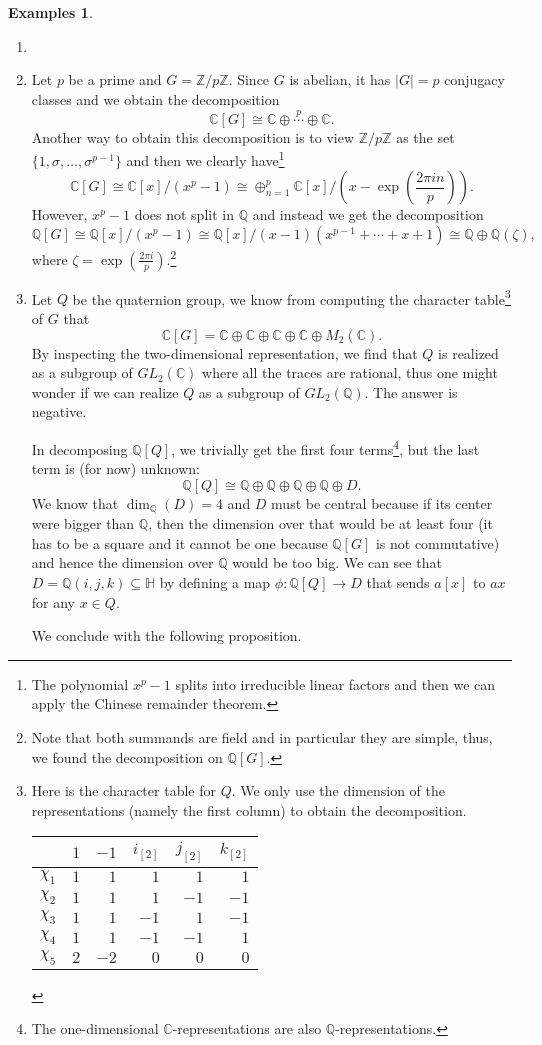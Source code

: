 \documentclass{tufte-handout} %
\theoremstyle{definition}
\newtheorem{exmps}[thm]{Examples}
\theoremstyle{remark}
\newcommand{\bra}[1]{\left(#1\right)}
\newcommand{\Z}{\mathbb{Z}}
\renewcommand{\C}{\mathbb{C}}
\newcommand{\Q}{\mathbb{Q}}
\newcommand{\bH}{\mathbb{H}}
\begin{document}
\begin{exmps}
	\begin{enumerate}
		\item[]
		\item Let $p$ be a prime and $G = \Z/p\Z$. Since $G$ is abelian, it has $|G| = p$ conjugacy classes and we obtain the decomposition	\[\C[G] \cong \C \oplus \stackrel{p}{\cdots} \oplus \C.\]
		Another way to obtain this decomposition is to view $\Z/p\Z$ as the set $\{1, \sigma, \dots, \sigma^{p-1}\}$ and then we clearly have\footnote{The polynomial $x^p-1$ splits into irreducible linear factors and then we can apply the Chinese remainder theorem.}
		\[\C[G] \cong \C[x]/(x^p-1) \cong \oplus_{n=1}^{p} \C[x]/\bra{x-\exp\bra{\frac{2\pi i n}{p}}}.\]
		However, $x^p-1$ does not split in $\Q$ and instead we get the decomposition
		\[\Q[G] \cong \Q[x]/(x^p-1) \cong \Q[x]/(x-1)(x^{p-1}+ \cdots + x + 1) \cong \Q \oplus \Q(\zeta),\] where $\zeta = \exp\bra{\frac{2\pi i}{p}}$.\footnote{Note that both summands are field and in particular they are simple, thus, we found the decomposition on $\Q[G]$.}
		\item Let $Q$ be the quaternion group, we know from computing the character table\footnote{Here is the character table for $Q$. We only use the dimension of the representations (namely the first column) to obtain the decomposition.
				\begin{tabular}{lrrrrr}
					& $1$ & $-1$ & $i_{[2]}$ & $j_{[2]}$ & $k_{[2]}$\\ \hline
					$\chi_1$ & $1$& $1$& $1$& $1$&$1$\\
					$\chi_2$ & $1$& $1$& $1$& $-1$&$-1$\\
					$\chi_3$ & $1$& $1$& $-1$& $1$&$-1$\\
					$\chi_4$ & $1$& $1$& $-1$& $-1$&$1$\\
					$\chi_5$ & $2$& $-2$& $0$& $0$&$0$\\ \hline
				\end{tabular}} of $G$ that \[\C[G] = \C \oplus \C \oplus \C \oplus \C \oplus M_2(\C).\]
		By inspecting the two-dimensional representation, we find that $Q$ is realized as a subgroup of $GL_2(\C)$ where all the traces are rational, thus one might wonder if we can realize $Q$ as a subgroup of $GL_2(\Q)$. The answer is negative.
		
		In decomposing $\Q[Q]$, we trivially get the first four terms\footnote{The one-dimensional $\C$-representations are also $\Q$-representations.}, but the last term is (for now) unknown: \[\Q[Q] \cong \Q \oplus \Q \oplus \Q \oplus \Q \oplus D.\]
		We know that $\dim_{\Q}(D) = 4$ and $D$ must be central because if its center were bigger than $\Q$, then the dimension over that would be at least four (it has to be a square and it cannot be one because $\Q[G]$ is not commutative)%
		and hence the dimension over $\Q$ would be too big. We can see that $D = \Q(i,j,k) \subseteq \bH$ by defining a map $\phi: \Q[Q] \rightarrow D$ that sends $a[x]$ to $ax$ for any $x \in Q$.
		
		We conclude with the following proposition.
 	\end{enumerate}
\end{exmps}
\end{document}
